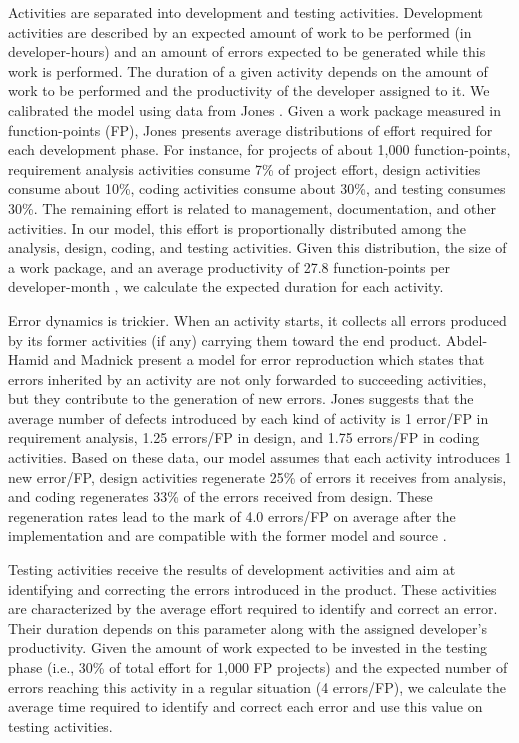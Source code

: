 \documentclass[conference]{IEEEtran}
\begin{document}
Activities are separated into development and testing activities. Development activities are described by an expected amount of work to be performed (in developer-hours) and an amount of errors expected to be generated while this work is performed. The duration of a given activity depends on the amount of work to be performed and the productivity of the developer assigned to it. We calibrated the model using data from Jones \cite{Jones:2000}. Given a work package measured in function-points (FP), Jones \cite{Jones:2000} presents average distributions of effort required for each development phase. For instance, for projects of about 1,000 function-points, requirement analysis activities consume 7\% of project effort, design activities consume about 10\%, coding activities consume about 30\%, and testing consumes 30\%. The remaining effort is related to management, documentation, and other activities. In our model, this effort is proportionally distributed among the analysis, design, coding, and testing activities. Given this distribution, the size of a work package, and an average productivity of 27.8 function-points per developer-month \cite{Jones:2000}, we calculate the expected duration for each activity.

Error dynamics is trickier. When an activity starts, it collects all errors produced by its former activities (if any) carrying them toward the end product. Abdel-Hamid and Madnick \cite{Abdel-Hamid:1991} present a model for error reproduction which states that errors inherited by an activity are not only forwarded to succeeding activities, but they contribute to the generation of new errors. Jones \cite{Jones:2000} suggests that the average number of defects introduced by each kind of activity is 1 error/FP in requirement analysis, 1.25 errors/FP in design, and 1.75 errors/FP in coding activities. Based on these data, our model assumes that each activity introduces 1 new error/FP, design activities regenerate 25\% of errors it receives from analysis, and coding regenerates 33\% of the errors received from design. These regeneration rates lead to the mark of 4.0 errors/FP on average after the implementation and are compatible with the former model \cite{Abdel-Hamid:1991} and source \cite{Jones:2000}.

Testing activities receive the results of development activities and aim at identifying and correcting the errors introduced in the product. These activities are characterized by the average effort required to identify and correct an error. Their duration depends on this parameter along with the assigned developer’s productivity. Given the amount of work expected to be invested in the testing phase \cite{Jones:2000} (i.e., 30\% of total effort for 1,000 FP projects) and the expected number of errors reaching this activity in a regular situation (4 errors/FP), we calculate the average time required to identify and correct each error and use this value on testing activities.
\end{document}
